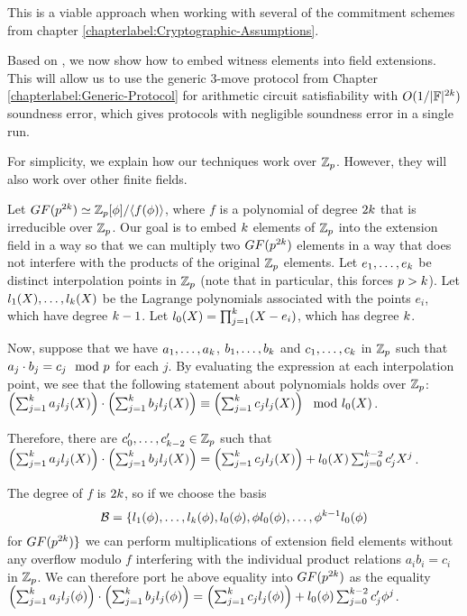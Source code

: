 This is a viable approach when working with several of the commitment schemes from chapter \ref{chapterlabel:Cryptographic-Assumptions}.

Based on \cite{BaumBCPGL18}, we now show how to embed witness elements into field extensions. This will allow us to use the generic 3-move protocol from Chapter \ref{chapterlabel:Generic-Protocol} for arithmetic circuit satisfiability with $O(1/|\mathbb{F}|^{2k})$ soundness error, which gives protocols with negligible soundness error in a single run.

For simplicity, we explain how our techniques work over $\mathbb{Z}_p$. However, they will also work over other finite fields.

Let $GF(p^{2k}) \simeq \mathbb{Z}_p[\phi]/\langle f(\phi) \rangle$, where $f$ is a polynomial of degree $2k$ that is irreducible over $\mathbb{Z}_p$. Our goal is to embed $k$ elements of $\mathbb{Z}_p$ into the extension field in a way so that we can multiply two $GF(p^{2k})$ elements in a way that does not interfere with the products of the original $\mathbb{Z}_p$ elements. Let $e_1,\ldots,e_k$ be distinct interpolation points in $\mathbb{Z}_p$ (note that in particular, this forces $p>k$). Let $l_1(X),\ldots,l_k(X)$ be the Lagrange polynomials associated with the points $e_i$, which have degree $k-1$. Let $l_0(X) = \prod_{j=1}^k (X-e_i)$, which has degree $k$.

Now, suppose that we have $a_1,\ldots,a_k$, $b_1,\ldots,b_k$ and $c_1,\ldots,c_k$ in $\mathbb{Z}_p$ such that $a_j \cdot b_j = c_j \mod {p}$ for each $j$. By evaluating the expression at each interpolation point, we see that the following statement about polynomials holds over $\mathbb{Z}_p$: $ \left( \sum_{j=1}^k a_j l_j(X) \right) \cdot \left( \sum_{j=1}^k b_j l_j(X) \right) \equiv \left( \sum_{j=1}^k c_j l_j(X) \right) \mod l_0(X)$.

Therefore, there are $c'_0,\ldots,c'_{k-2}\in \mathbb{Z}_p$ such that $\left( \sum_{j=1}^k a_j l_j(X) \right) \cdot \left( \sum_{j=1}^k b_j l_j(X) \right) = \left( \sum_{j=1}^k c_j l_j(X) \right) + l_0(X) \sum_{j=0}^{k-2} c'_j X^j$.

The degree of $f$ is $2k$, so if we choose the basis
\[\mathcal{B} = \{ l_1(\phi),\ldots,l_k(\phi),l_0(\phi),\phi l_0(\phi),\ldots,\phi^{k-1} l_0(\phi)\]
for $GF(p^{2k}) \}$ we can perform multiplications of extension field elements without any overflow modulo $f$ interfering with the individual product relations $a_i b_i = c_i$ in $\mathbb{Z}_p$. We can therefore port he above equality into $GF(p^{2k})$ as the equality $\left( \sum_{j=1}^k a_j l_j(\phi) \right) \cdot \left( \sum_{j=1}^k b_j l_j(\phi) \right) = \left( \sum_{j=1}^k c_j l_j(\phi) \right) + l_0(\phi) \sum_{j=0}^{k-2} c'_j \phi^j$.

